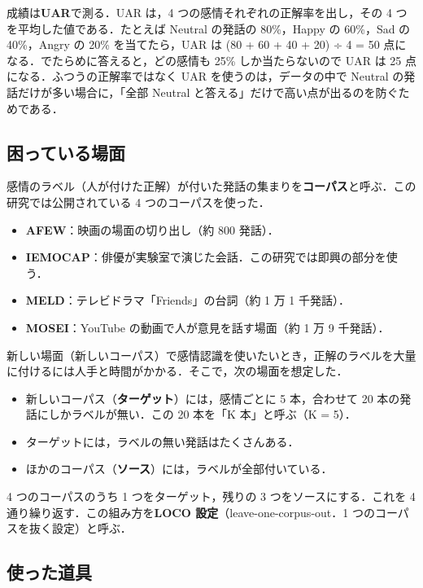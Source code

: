 \documentclass[a4paper,11pt]{ltjsarticle}
\begin{document}
成績は\textbf{UAR}で測る．UAR は，4 つの感情それぞれの正解率を出し，その 4 つを平均した値である．たとえば Neutral の発話の 80\%，Happy の 60\%，Sad の 40\%，Angry の 20\% を当てたら，UAR は (80 + 60 + 40 + 20) ÷ 4 = 50 点になる．でたらめに答えると，どの感情も 25\% しか当たらないので UAR は 25 点になる．ふつうの正解率ではなく UAR を使うのは，データの中で Neutral の発話だけが多い場合に，「全部 Neutral と答える」だけで高い点が出るのを防ぐためである．

\subsection{困っている場面}

感情のラベル（人が付けた正解）が付いた発話の集まりを\textbf{コーパス}と呼ぶ．この研究では公開されている 4 つのコーパスを使った．
\begin{itemize}
  \item \textbf{AFEW}：映画の場面の切り出し（約 800 発話）．
  \item \textbf{IEMOCAP}：俳優が実験室で演じた会話．この研究では即興の部分を使う．
  \item \textbf{MELD}：テレビドラマ「Friends」の台詞（約 1 万 1 千発話）．
  \item \textbf{MOSEI}：YouTube の動画で人が意見を話す場面（約 1 万 9 千発話）．
\end{itemize}

新しい場面（新しいコーパス）で感情認識を使いたいとき，正解のラベルを大量に付けるには人手と時間がかかる．そこで，次の場面を想定した．
\begin{itemize}
  \item 新しいコーパス（\textbf{ターゲット}）には，感情ごとに 5 本，合わせて 20 本の発話にしかラベルが無い．この 20 本を「K 本」と呼ぶ（K = 5）．
  \item ターゲットには，ラベルの無い発話はたくさんある．
  \item ほかのコーパス（\textbf{ソース}）には，ラベルが全部付いている．
\end{itemize}
4 つのコーパスのうち 1 つをターゲット，残りの 3 つをソースにする．これを 4 通り繰り返す．この組み方を\textbf{LOCO 設定}（leave-one-corpus-out．1 つのコーパスを抜く設定）と呼ぶ．

\subsection{使った道具}
\end{document}
